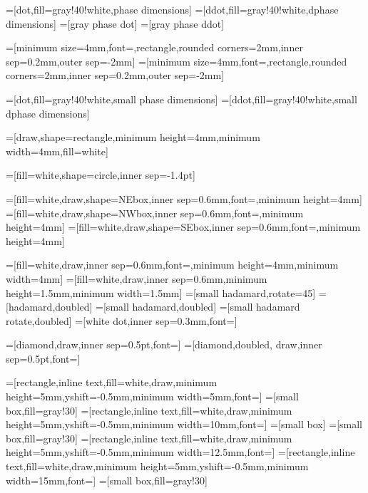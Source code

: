 =[dot,fill=gray!40!white,phase dimensions]
=[ddot,fill=gray!40!white,dphase dimensions]
=[gray phase dot]
=[gray phase ddot]

=[minimum size=4mm,font=\tiny,rectangle,rounded corners=2mm,inner sep=0.2mm,outer sep=-2mm]
=[minimum size=4mm,font=\tiny,rectangle,rounded corners=2mm,inner sep=0.2mm,outer sep=-2mm]

=[dot,fill=gray!40!white,small phase dimensions]
=[ddot,fill=gray!40!white,small dphase dimensions]


=[draw,shape=rectangle,minimum height=4mm,minimum width=4mm,fill=white]

=[fill=white,shape=circle,inner sep=-1.4pt]

=[fill=white,draw,shape=NEbox,inner sep=0.6mm,font=\footnotesize,minimum height=4mm]
=[fill=white,draw,shape=NWbox,inner sep=0.6mm,font=\footnotesize,minimum height=4mm]
=[fill=white,draw,shape=SEbox,inner sep=0.6mm,font=\footnotesize,minimum height=4mm]


=[fill=white,draw,inner sep=0.6mm,font=\footnotesize,minimum height=4mm,minimum width=4mm]
=[fill=white,draw,inner sep=0.6mm,minimum height=1.5mm,minimum width=1.5mm]
=[small hadamard,rotate=45]
=[hadamard,doubled]
=[small hadamard,doubled]
=[small hadamard rotate,doubled]
=[white dot,inner sep=0.3mm,font=\footnotesize]

=[diamond,draw,inner sep=0.5pt,font=\small]
=[diamond,doubled, draw,inner sep=0.5pt,font=\small]

=[rectangle,inline text,fill=white,draw,minimum height=5mm,yshift=-0.5mm,minimum width=5mm,font=\small]
=[small box,fill=gray!30]
=[rectangle,inline text,fill=white,draw,minimum height=5mm,yshift=-0.5mm,minimum width=10mm,font=\small]
=[small box] %
=[small box,fill=gray!30]
=[rectangle,inline text,fill=white,draw,minimum height=5mm,yshift=-0.5mm,minimum width=12.5mm,font=\small]
=[rectangle,inline text,fill=white,draw,minimum height=5mm,yshift=-0.5mm,minimum width=15mm,font=\small]
=[small box,fill=gray!30]

